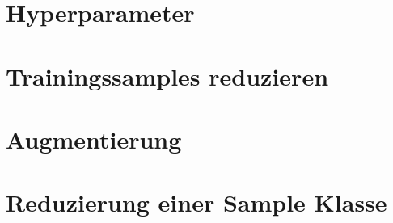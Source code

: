 \section{Hyperparameter}


\section{Trainingssamples reduzieren}


\section{Augmentierung}


\section{Reduzierung einer Sample Klasse}
